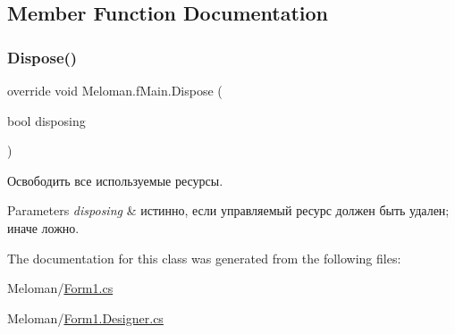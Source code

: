 \subsection{Member Function Documentation}
\mbox{\label{class_meloman_1_1f_main_aee2339b14f1f64b2c140a40b234cd0b0}} 
\subsubsection{\texorpdfstring{Dispose()}{Dispose()}}
{\footnotesize\ttfamily override void Meloman.\+f\+Main.\+Dispose (\begin{DoxyParamCaption}\item[{bool}]{disposing }\end{DoxyParamCaption})\hspace{0.3cm}{\ttfamily [protected]}}



Освободить все используемые ресурсы. 


\begin{DoxyParams}{Parameters}
{\em disposing} & истинно, если управляемый ресурс должен быть удален; иначе ложно.\\
\hline
\end{DoxyParams}


The documentation for this class was generated from the following files\+:\begin{DoxyCompactItemize}
\item 
Meloman/\mbox{\hyperlink{_form1_8cs}{Form1.\+cs}}\item 
Meloman/\mbox{\hyperlink{_form1_8_designer_8cs}{Form1.\+Designer.\+cs}}\end{DoxyCompactItemize}
